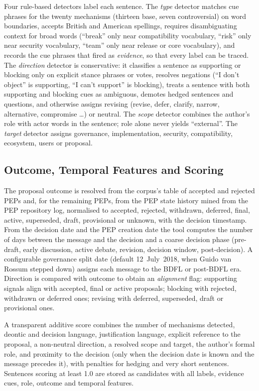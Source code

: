 \documentclass[sigconf,screen]{acmart}
\begin{document}
Four rule-based detectors label each sentence. The \emph{type} detector matches cue phrases for the twenty mechanisms (thirteen base, seven controversial) on word boundaries, accepts British and American spellings, requires disambiguating context for broad words (``break'' only near compatibility vocabulary, ``risk'' only near security vocabulary, ``team'' only near release or core vocabulary), and records the cue phrases that fired as \emph{evidence}, so that every label can be traced. The \emph{direction} detector is conservative: it classifies a sentence as supporting or blocking only on explicit stance phrases or votes, resolves negations (``I don't object'' is supporting, ``I can't support'' is blocking), treats a sentence with both supporting and blocking cues as ambiguous, demotes hedged sentences and questions, and otherwise assigns revising (revise, defer, clarify, narrow, alternative, compromise \ldots) or neutral. The \emph{scope} detector combines the author's role with actor words in the sentence; role alone never yields ``external''. The \emph{target} detector assigns governance, implementation, security, compatibility, ecosystem, users or proposal.

\subsection{Outcome, Temporal Features and Scoring}
\label{sec:features}

The proposal outcome is resolved from the corpus's table of accepted and rejected PEPs and, for the remaining PEPs, from the PEP state history mined from the PEP repository log, normalised to accepted, rejected, withdrawn, deferred, final, active, superseded, draft, provisional or unknown, with the decision timestamp. From the decision date and the PEP creation date the tool computes the number of days between the message and the decision and a coarse decision phase (pre-draft, early discussion, active debate, revision, decision window, post-decision). A configurable governance split date (default 12~July~2018, when Guido van Rossum stepped down) assigns each message to the BDFL or post-BDFL era. Direction is compared with outcome to obtain an \emph{alignment} flag: supporting signals align with accepted, final or active proposals; blocking with rejected, withdrawn or deferred ones; revising with deferred, superseded, draft or provisional ones.

A transparent additive score combines the number of mechanisms detected, deontic and decision language, justification language, explicit reference to the proposal, a non-neutral direction, a resolved scope and target, the author's formal role, and proximity to the decision (only when the decision date is known and the message precedes it), with penalties for hedging and very short sentences. Sentences scoring at least 1.0 are stored as candidates with all labels, evidence cues, role, outcome and temporal features.
\end{document}

